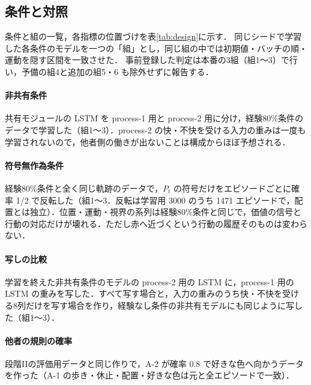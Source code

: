 \subsection{条件と対照}\label{sec:conditions}
条件と組の一覧，各指標の位置づけを表\ref{tab:design}に示す．
同じシードで学習した各条件のモデルを一つの「組」とし，同じ組の中では初期値・バッチの順・運動を隠す区間を一致させた．
事前登録した判定は本番の3組（組1〜3）で行い，予備の組4と追加の組5・6 も除外せずに報告する．

\paragraph{非共有条件}共有モジュールの LSTM を process-1 用と process-2 用に分け，経験80\%条件のデータで学習した（組1〜3）．process-2 の快・不快を受ける入力の重みは一度も学習されないので，他者側の働きが出ないことは構成からほぼ予想される．

\paragraph{符号無作為条件}経験80\%条件と全く同じ軌跡のデータで，$P_t$ の符号だけをエピソードごとに確率 1/2 で反転した（組1〜3．反転は学習用 3000 のうち 1471 エピソードで，配置とは独立）．位置・運動・視界の系列は経験80\%条件と同じで，価値の信号と行動の対応だけが壊れる．ただし赤へ近づくという行動の履歴そのものは変わらない．

\paragraph{写しの比較}学習を終えた非共有条件のモデルの process-2 用の LSTM に，process-1 用の LSTM の重みを写した．すべて写す場合と，入力の重みのうち快・不快を受ける8列だけを写す場合を作り，経験なし条件の非共有モデルにも同じように写した（組1〜3）．

\paragraph{他者の規則の確率}段階IIの評価用データと同じ作りで，A-2 が確率 0.8 で好きな色へ向かうデータを作った（A-1 の歩き・休止・配置・好きな色は元と全エピソードで一致）．

\begin{table}[tbp]
  \centering
  \footnotesize
  \caption{条件，指標，事前登録の区別}
  \label{tab:design}
  
\end{table}

